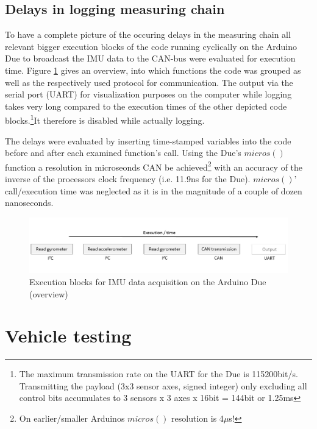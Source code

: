 \documentclass[ExampleMasters.tex]{subfiles}
\begin{document}
\subsection{Delays in logging measuring chain}
\label{sec:delays_on_arduino}

To have a complete picture of the occuring delays in the measuring chain all relevant bigger execution blocks of the code running cyclically on the Arduino Due to broadcast the \gls{IMU} data to the CAN-bus were evaluated for execution time. Figure \ref{fig:arduino_delays_sketch} gives an overview, into which functions the code was grouped as well as the respectively used protocol for communication. The output via the serial port (\gls{UART}) for visualization purposes on the computer while logging takes very long compared to the execution times of the other depicted code blocks.\footnote{The maximum transmission rate on the \gls{UART} for the Due is 115200bit/s. Transmitting the payload (3x3 sensor axes, signed integer) only excluding all control bits accumulates to 3 sensors x 3 axes x 16bit = 144bit  or 1.25ms}It therefore is disabled while actually logging. 

The delays were evaluated by inserting time-stamped variables into the code before and after each examined function's call. Using the Due's $micros()$ function a resolution in microseonds \gls{CAN} be achieved\footnote{On earlier/smaller Arduinos $micros()$ resolution is 4$\mu$s!} with an accuracy of the inverse of the processors clock frequency (i.e. 11.9ns for the Due). $micros()$' call/execution time was neglected as it is in the magnitude of a couple of dozen nanoseconds.

\begin{figure}[h!]
\centering
\includegraphics[width=1\linewidth]{figures/arduino_delays_sketch}
\caption[Execution blocks for \acrshort{IMU} data acquisition on the Arduino Due (overview)]{Execution blocks for \gls{IMU} data acquisition on the Arduino Due (overview)}
\label{fig:arduino_delays_sketch}
\end{figure}


\section{Vehicle testing}
\label{sec:vehicle-testing}
\end{document}
